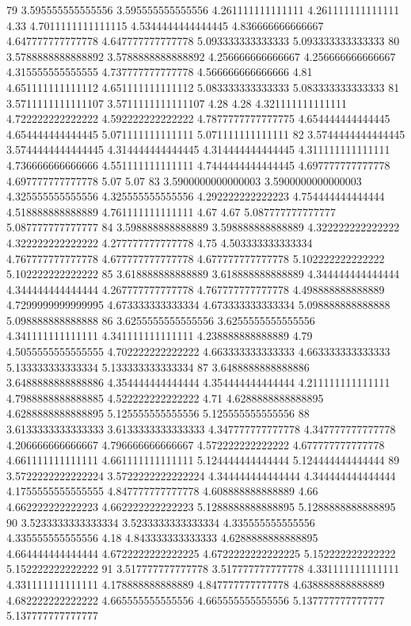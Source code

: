 79 3.595555555555556 3.595555555555556 4.261111111111111 4.261111111111111 4.33 4.7011111111111115 4.5344444444444445 4.836666666666667 4.647777777777778 4.647777777777778 5.093333333333333 5.093333333333333
80 3.5788888888888892 3.5788888888888892 4.256666666666667 4.256666666666667 4.315555555555555 4.737777777777778 4.566666666666666 4.81 4.651111111111112 4.651111111111112 5.083333333333333 5.083333333333333
81 3.5711111111111107 3.5711111111111107 4.28 4.28 4.321111111111111 4.722222222222222 4.592222222222222 4.7877777777777775 4.654444444444445 4.654444444444445 5.071111111111111 5.071111111111111
82 3.5744444444444445 3.5744444444444445 4.314444444444445 4.314444444444445 4.311111111111111 4.736666666666666 4.551111111111111 4.7444444444444445 4.697777777777778 4.697777777777778 5.07 5.07
83 3.5900000000000003 3.5900000000000003 4.325555555555556 4.325555555555556 4.292222222222223 4.754444444444444 4.518888888888889 4.761111111111111 4.67 4.67 5.087777777777777 5.087777777777777
84 3.598888888888889 3.598888888888889 4.322222222222222 4.322222222222222 4.277777777777778 4.75 4.503333333333334 4.767777777777778 4.677777777777778 4.677777777777778 5.102222222222222 5.102222222222222
85 3.618888888888889 3.618888888888889 4.344444444444444 4.344444444444444 4.267777777777778 4.767777777777778 4.498888888888889 4.7299999999999995 4.673333333333334 4.673333333333334 5.098888888888888 5.098888888888888
86 3.6255555555555556 3.6255555555555556 4.341111111111111 4.341111111111111 4.238888888888889 4.79 4.5055555555555555 4.702222222222222 4.663333333333333 4.663333333333333 5.133333333333334 5.133333333333334
87 3.6488888888888886 3.6488888888888886 4.354444444444444 4.354444444444444 4.211111111111111 4.7988888888888885 4.522222222222222 4.71 4.6288888888888895 4.6288888888888895 5.125555555555556 5.125555555555556
88 3.6133333333333333 3.6133333333333333 4.347777777777778 4.347777777777778 4.206666666666667 4.796666666666667 4.572222222222222 4.677777777777778 4.661111111111111 4.661111111111111 5.124444444444444 5.124444444444444
89 3.5722222222222224 3.5722222222222224 4.344444444444444 4.344444444444444 4.1755555555555555 4.847777777777778 4.608888888888889 4.66 4.662222222222223 4.662222222222223 5.1288888888888895 5.1288888888888895
90 3.5233333333333334 3.5233333333333334 4.335555555555556 4.335555555555556 4.18 4.843333333333333 4.6288888888888895 4.664444444444444 4.6722222222222225 4.6722222222222225 5.152222222222222 5.152222222222222
91 3.517777777777778 3.517777777777778 4.331111111111111 4.331111111111111 4.178888888888889 4.847777777777778 4.638888888888889 4.682222222222222 4.665555555555556 4.665555555555556 5.137777777777777 5.137777777777777
